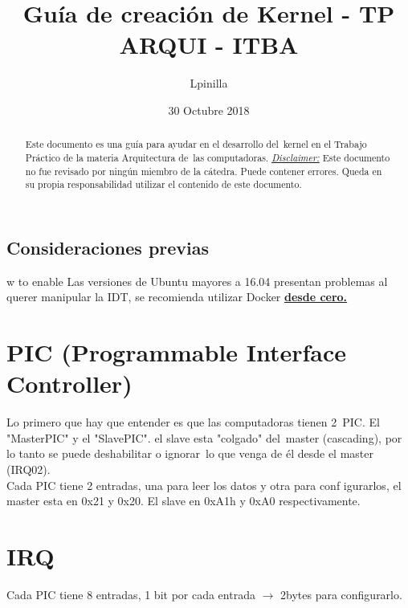\documentclass[]{article}
\title{Gu\'ia de creaci\'on de Kernel - TP ARQUI - ITBA}
\author{Lpinilla}
\date{30 Octubre 2018}
\begin{document}
\maketitle

\begin{abstract}
	Este documento es una guía para ayudar en el desarrollo del\
	kernel en el Trabajo Práctico de la materia Arquitectura de\
	las computadoras. 
	\underline{\textit{Disclaimer:}} Este documento no fue revisado por ning\'un miembro de la c\'atedra. Puede contener errores. Queda en su propia responsabilidad utilizar el contenido de este documento.
\end{abstract}

\subsection*{Consideraciones previas}w to enable
Las versiones de Ubuntu mayores a 16.04 presentan problemas al querer manipular la IDT, se recomienda utilizar Docker \textbf{\underline{desde cero.}}

\section*{PIC (Programmable Interface Controller)}
Lo primero que hay que entender es que las computadoras tienen 2\
PIC. El "MasterPIC" y el "SlavePIC". el slave esta "colgado" del\
master (cascading), por lo tanto se puede deshabilitar o ignorar\
lo que venga de él desde el master (IRQ02).\\
Cada PIC tiene 2 entradas, una para leer los datos y otra para conf
igurarlos, el master esta en 0x21 y 0x20. El slave en 0xA1h y 0xA0
respectivamente.

\section*{IRQ}
Cada PIC tiene 8 entradas, 1 bit por cada entrada $\longrightarrow$ 2bytes para configurarlo.
\end{document}
